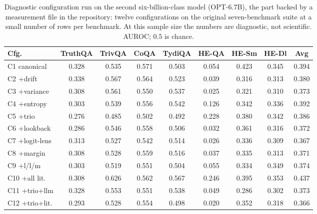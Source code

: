 \begin{table}[h]
\centering
\caption{Diagnostic configuration run on the second six-billion-class model (OPT-6.7B), the part backed by a measurement file in the repository: twelve configurations on the original seven-benchmark suite at a small number of rows per benchmark. At this sample size the numbers are diagnostic, not scientific. AUROC; $0.5$ is chance.}
\label{tab:app-opt-diag}
\footnotesize
\setlength{\tabcolsep}{4pt}
\begin{tabular}{lccccccc|c}
\toprule
Cfg. & TruthQA & TrivQA & CoQA & TydiQA & HE-QA & HE-Sm & HE-Dl & Avg \\
\midrule
C1 canonical & 0.328 & 0.535 & 0.571 & 0.503 & 0.054 & 0.423 & 0.345 & 0.394 \\
C2 {+}drift & 0.338 & 0.567 & 0.564 & 0.523 & 0.039 & 0.316 & 0.313 & 0.380 \\
C3 {+}variance & 0.308 & 0.561 & 0.550 & 0.537 & 0.025 & 0.321 & 0.310 & 0.373 \\
C4 {+}entropy & 0.303 & 0.539 & 0.556 & 0.542 & 0.126 & 0.342 & 0.336 & 0.392 \\
C5 {+}trio & 0.276 & 0.485 & 0.502 & 0.492 & 0.228 & 0.380 & 0.342 & 0.386 \\
C6 {+}lookback & 0.286 & 0.546 & 0.558 & 0.506 & 0.032 & 0.361 & 0.316 & 0.372 \\
C7 {+}logit-lens & 0.313 & 0.527 & 0.542 & 0.514 & 0.026 & 0.336 & 0.309 & 0.367 \\
C8 {+}margin & 0.308 & 0.528 & 0.559 & 0.516 & 0.037 & 0.335 & 0.313 & 0.371 \\
C9 {+}l/l/m & 0.303 & 0.519 & 0.551 & 0.504 & 0.055 & 0.334 & 0.349 & 0.374 \\
C10 {+}all lit. & 0.308 & 0.626 & 0.562 & 0.567 & 0.246 & 0.395 & 0.353 & 0.437 \\
C11 {+}trio{+}llm & 0.328 & 0.553 & 0.551 & 0.538 & 0.049 & 0.286 & 0.302 & 0.373 \\
C12 {+}trio{+}lit. & 0.293 & 0.528 & 0.554 & 0.498 & 0.020 & 0.352 & 0.318 & 0.366 \\
\bottomrule
\end{tabular}
\end{table}